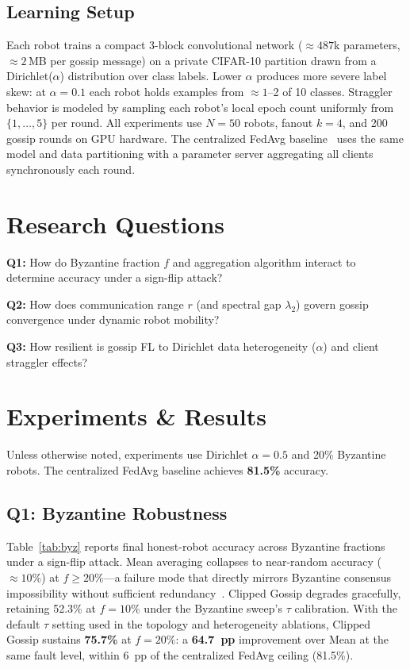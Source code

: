 \documentclass[conference]{IEEEtran}
\begin{document}
\subsection{Learning Setup}

Each robot trains a compact 3-block convolutional network
(${\approx}487$k parameters, ${\approx}2$\,MB per gossip message) on a
private CIFAR-10 partition drawn from a Dirichlet($\alpha$) distribution
over class labels.
Lower $\alpha$ produces more severe label skew: at $\alpha{=}0.1$ each
robot holds examples from ${\approx}1$--2 of 10 classes.
Straggler behavior is modeled by sampling each robot's local epoch count
uniformly from $\{1,\ldots,5\}$ per round.
All experiments use $N{=}50$ robots, fanout $k{=}4$, and 200 gossip rounds
on GPU hardware.
The centralized FedAvg baseline~\cite{mcmahan2017} uses the same model and
data partitioning with a parameter server aggregating all clients
synchronously each round.

\section{Research Questions}

\textbf{Q1:} How do Byzantine fraction $f$ and aggregation algorithm interact
to determine accuracy under a sign-flip attack?

\textbf{Q2:} How does communication range $r$ (and spectral gap $\lambda_2$)
govern gossip convergence under dynamic robot mobility?

\textbf{Q3:} How resilient is gossip FL to Dirichlet data heterogeneity
($\alpha$) and client straggler effects?

\section{Experiments \& Results}

Unless otherwise noted, experiments use Dirichlet $\alpha{=}0.5$ and
20\% Byzantine robots.
The centralized FedAvg baseline achieves \textbf{81.5\%} accuracy.

\subsection{Q1: Byzantine Robustness}

Table~\ref{tab:byz} reports final honest-robot accuracy across Byzantine
fractions under a sign-flip attack.
Mean averaging collapses to near-random accuracy (${\approx}10\%$) at
$f{\geq}20\%$---a failure mode that directly mirrors Byzantine consensus
impossibility without sufficient redundancy~\cite{lamport1982}.
Clipped Gossip degrades gracefully, retaining 52.3\% at $f{=}10\%$
under the Byzantine sweep's $\tau$ calibration.
With the default $\tau$ setting used in the topology and heterogeneity
ablations, Clipped Gossip sustains \textbf{75.7\%} at $f{=}20\%$: a
\textbf{64.7~pp} improvement over Mean at the same fault level, within
6~pp of the centralized FedAvg ceiling (81.5\%).
\end{document}
